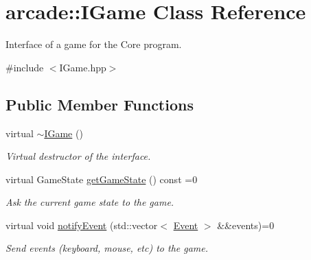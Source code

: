 \hypertarget{classarcade_1_1IGame}{}\section{arcade\+:\+:I\+Game Class Reference}
\label{classarcade_1_1IGame}


Interface of a game for the Core program.  




{\ttfamily \#include $<$I\+Game.\+hpp$>$}

\subsection*{Public Member Functions}
\begin{DoxyCompactItemize}
\item 
\mbox{\label{classarcade_1_1IGame_a89114f708822e3d0db5b58901c1e2354}} 
virtual \hyperlink{classarcade_1_1IGame_a89114f708822e3d0db5b58901c1e2354}{$\sim$\+I\+Game} ()
\begin{DoxyCompactList}\small\item\em Virtual destructor of the interface. \end{DoxyCompactList}\item 
\mbox{\label{classarcade_1_1IGame_a75083f0465c0ccbdbbb38c689b4a694c}} 
virtual Game\+State \hyperlink{classarcade_1_1IGame_a75083f0465c0ccbdbbb38c689b4a694c}{get\+Game\+State} () const =0
\begin{DoxyCompactList}\small\item\em Ask the current game state to the game. \end{DoxyCompactList}\item 
\mbox{\label{classarcade_1_1IGame_a37d164b4052fa3c28256fb0bf0002876}} 
virtual void \hyperlink{classarcade_1_1IGame_a37d164b4052fa3c28256fb0bf0002876}{notify\+Event} (std\+::vector$<$ \hyperlink{structarcade_1_1Event}{Event} $>$ \&\&events)=0
\begin{DoxyCompactList}\small\item\em Send events (keyboard, mouse, etc) to the game. \end{DoxyCompactList}\item 
\mbox{\label{classarcade_1_1IGame_aaf375290947abf3db32d966facbfacf3}} 

\end{DoxyCompactItemize}
